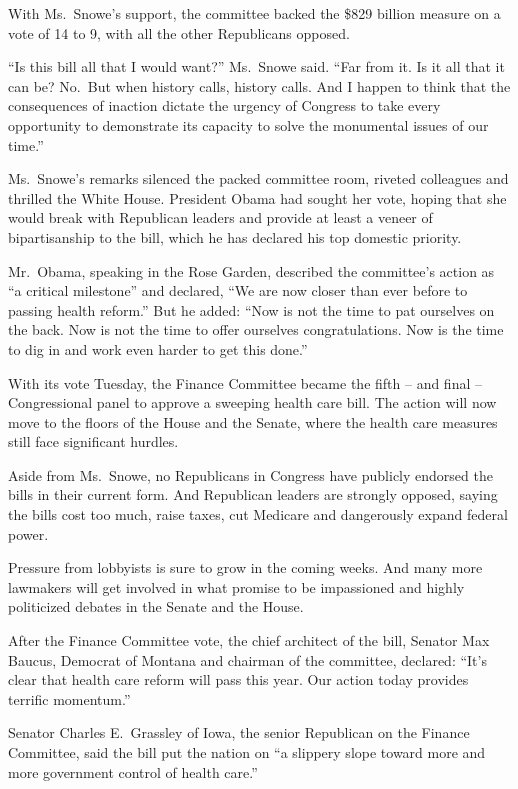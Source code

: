 ﻿\documentclass[12pt]{article}
\begin{document}
With Ms.~Snowe's support, the committee backed the \$829 billion measure on a vote of 14 to 9, with
all the other Republicans opposed.

``Is this bill all that I would want?'' Ms.~Snowe said. ``Far from it. Is it all that it can be?
No.~But when history calls, history calls. And I happen to think that the consequences of inaction
dictate the urgency of Congress to take every opportunity to demonstrate its capacity to solve the
monumental issues of our time.''

Ms.~Snowe's remarks silenced the packed committee room, riveted colleagues and thrilled the White
House. President Obama had sought her vote, hoping that she would break with Republican leaders and
provide at least a veneer of bipartisanship to the bill, which he has declared his top domestic
priority.

Mr.~Obama, speaking in the Rose Garden, described the committee's action as ``a critical milestone''
and declared, ``We are now closer than ever before to passing health reform.'' But he added: ``Now
is not the time to pat ourselves on the back. Now is not the time to offer ourselves
congratulations. Now is the time to dig in and work even harder to get this done.''

With its vote Tuesday, the Finance Committee became the fifth -- and final -- Congressional panel to
approve a sweeping health care bill. The action will now move to the floors of the House and the
Senate, where the health care measures still face significant hurdles.

Aside from Ms.~Snowe, no Republicans in Congress have publicly endorsed the bills in their current
form. And Republican leaders are strongly opposed, saying the bills cost too much, raise taxes, cut
Medicare and dangerously expand federal power.

Pressure from lobbyists is sure to grow in the coming weeks. And many more lawmakers will get
involved in what promise to be impassioned and highly politicized debates in the Senate and the
House.

After the Finance Committee vote, the chief architect of the bill, Senator Max Baucus, Democrat of
Montana and chairman of the committee, declared: ``It's clear that health care reform will pass this
year. Our action today provides terrific momentum.''

Senator Charles E.~Grassley of Iowa, the senior Republican on the Finance Committee, said the bill
put the nation on ``a slippery slope toward more and more government control of health care.''
\end{document}
